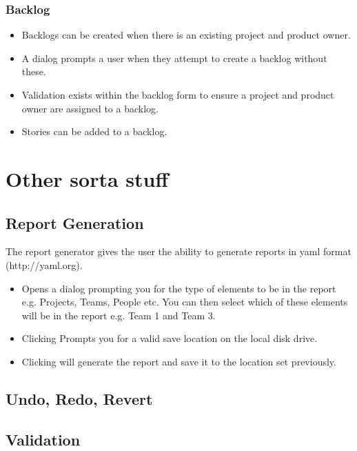 \documentclass[11pt,fleqn]{book} %
\begin{document}
\subsection{Backlog}
\begin{itemize}
\item Backlogs can be created when there is an existing project and product owner.
\item A dialog prompts a user when they attempt to create a backlog without these.
\item Validation exists within the backlog form to ensure a project and product owner are assigned to a backlog.
\item Stories can be added to a backlog.
\end{itemize}

\chapter{Other sorta stuff}
\section{Report Generation}
The report generator gives the user the ability to generate reports in yaml format (http://yaml.org).
\begin{itemize}
  \item {} Opens a dialog prompting you for the type of elements to be in the report
  e.g. Projects, Teams, People etc. You can then select which of these elements will be in the report e.g. Team 1 and
  Team 3.
  \item Clicking  Prompts you for a valid save location on the local disk drive.
  \item Clicking  will generate the report and save it to the location set previously.
\end{itemize}

\section{Undo, Redo, Revert}

\section{Validation}
\end{document}
